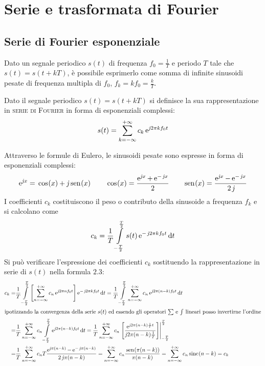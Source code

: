 \chapter{Serie e trasformata di Fourier}
\label{ch:teoriasegnali-capitolo2}
\section{Serie di Fourier esponenziale}
Dato un segnale periodico $s(t)$ di frequenza $f_0=\frac{1}{T}$ e periodo $T$ tale che $s(t)=s(t+k T)$, è possibile esprimerlo come somma di infinite sinusoidi pesate di frequenza multipla di $f_0$, $f_k=k f_0=\frac{k}{T}$.

\begin{definizione}
Dato il segnale periodico $s(t)=s(t+k T)$ si definisce la sua rappresentazione in \textsc{serie di Fourier} in forma di esponenziali complessi:
\begin{equation}
	\label{eq:serie_fourier}
	s(t)=\sum_{k=-\infty}^{+\infty} c_k \operatorname{e}^{\operatorname{\mathit{j}\!} 2\pi k f_0 t}
\end{equation}
\end{definizione}
Attraverso le formule di Eulero, le sinusoidi pesate sono espresse in forma di esponenziali complessi:
\begin{equation}
	\e{\imath x}=\cos{x}+\imath\sen{x}\qquad\cos{x}=\frac{\e{\imath x}+\e{-\imath x}}{2}\qquad\sen{x}=\frac{\e{\imath x}-\e{-\imath x}}{2\imath}
\end{equation}
I coefficienti $c_k$ costituiscono il peso o contributo della sinusoide a frequenza $f_k$ e si calcolano come
\begin{equation}
	\label{eq:serie_fourier_coef}
	c_k=\frac{1}{T}\int\limits_{-\frac{T}{2}}^{\frac{T}{2}}{s(t)\operatorname{e}^{-\operatorname{\mathit{j}\!} 2\pi k f_0 t}}{\,\mathop{}\!\mathrm{d}{t}}
\end{equation}
Si può verificare l'espressione dei coefficienti $c_k$ sostituendo la rappresentazione in serie di $s(t)$ nella formula $2.3$:
\begin{align*}
	c_k=&\frac{1}{T}\intd{-\frac{T}{2}}{\frac{T}{2}}{ \left[\sum_{n=-\infty}^{+\infty} c_n \e{\imath 2\pi n f_0 t}\right] \e{-\imath 2\pi k f_0 t}}{t} 
	=\frac{1}{T}\intd{-\frac{T}{2}}{\frac{T}{2}}{ \sum_{n=-\infty}^{+\infty} c_n \e{\imath 2\pi (n-k) f_0 t} }{t} \\
\intertext{ipotizzando la convergenza della serie $s(t)$ ed essendo gli operatori $\sum$ e $\int$ lineari posso invertirne l'ordine} 
	=&\frac{1}{T}\sum_{n=-\infty}^{+\infty} c_n \intd{-\frac{T}{2}}{\frac{T}{2}}{\e{\imath 2\pi(n-k)f_0 t}}{t}
	=\frac{1}{T}\sum_{n=-\infty}^{+\infty} c_n \bound{-\frac{T}{2}}{\frac{T}{2}}{\frac{\e{\imath 2\pi(n-k)\frac{1}{T}t}}{\imath 2\pi(n-k)\frac{1}{T} }}\\
	=&\frac{1}{T}\sum_{n=-\infty}^{+\infty} c_n T \frac{\e{\imath \pi(n-k)}-\e{-\imath\pi(n-k)}}{2\imath\pi(n-k)}
	=\sum_{n=-\infty}^{+\infty} c_n \frac{\sen{\pi(n-k)}}{\pi(n-k)}
	=\sum_{n=-\infty}^{+\infty} c_n \sinc{n-k} = c_k
\end{align*}
